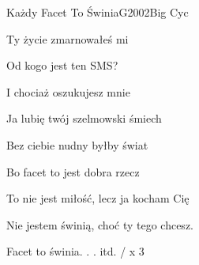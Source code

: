 \documentclass[a4paper,draft]{book}
\begin{document}
\begin{song}{Każdy Facet To Świnia}{G}{2002}{Big Cyc}{}{}
\begin{SBVerse}
	Ty życie zmarnowałeś mi

	Od kogo jest ten SMS?

	I chociaż oszukujesz mnie

	Ja lubię twój szelmowski śmiech

	Bez ciebie nudny byłby świat

	Bo facet to jest dobra rzecz

	To nie jest miłość, lecz ja kocham Cię

	Nie jestem świnią, choć ty tego chcesz.
	\end{SBVerse}
	\begin{SBChorus}
	Facet to świnia. . . itd. / x 3
	\end{SBChorus}
\end{song}

\end{document}
